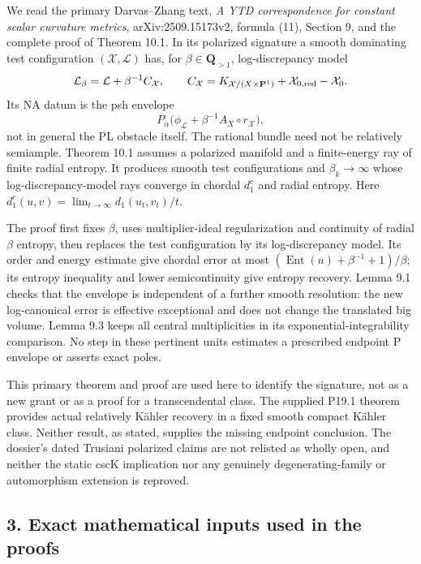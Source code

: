\documentclass[
  11pt,
]{article}
\begin{document}
We read the primary Darvas--Zhang text, \emph{A YTD correspondence for
constant scalar curvature metrics}, arXiv:2509.15173v2, formula (11),
Section 9, and the complete proof of Theorem 10.1. In its polarized
signature a smooth dominating test configuration
\((\mathcal X,\mathcal L)\) has, for \(\beta\in\mathbf Q_{>1}\),
log-discrepancy model \[
 \mathcal L_\beta=\mathcal L+\beta^{-1}C_{\mathcal X},\qquad
 C_{\mathcal X}=K_{\mathcal X/(X\times\mathbf P^1)}
                          +\mathcal X_{0,\rm red}-\mathcal X_0.
\] Its NA datum is the psh envelope \[
 P_\alpha\bigl(\phi_{\mathcal L}
                  +\beta^{-1}A_X\circ r_{\mathcal X}\bigr),
\] not in general the PL obstacle itself. The rational bundle need not
be relatively semiample. Theorem 10.1 assumes a polarized manifold and a
finite-energy ray of finite radial entropy. It produces smooth test
configurations and \(\beta_k\to\infty\) whose log-discrepancy-model rays
converge in chordal \(d_1^c\) and radial entropy. Here
\(d_1^c(u,v)=\lim_{t\to\infty}d_1(u_t,v_t)/t\).

The proof first fixes \(\beta\), uses multiplier-ideal regularization
and continuity of radial \(\beta\) entropy, then replaces the test
configuration by its log-discrepancy model. Its order and energy
estimate give chordal error at most
\((\operatorname{Ent}(u)+\beta^{-1}+1)/\beta\); its entropy inequality
and lower semicontinuity give entropy recovery. Lemma 9.1 checks that
the envelope is independent of a further smooth resolution: the new
log-canonical error is effective exceptional and does not change the
translated big volume. Lemma 9.3 keeps all central multiplicities in its
exponential-integrability comparison. No step in these pertinent units
estimates a prescribed endpoint P envelope or asserts exact poles.

This primary theorem and proof are used here to identify the signature,
not as a new grant or as a proof for a transcendental class. The
supplied P19.1 theorem provides actual relatively Kähler recovery in a
fixed smooth compact Kähler class. Neither result, as stated, supplies
the missing endpoint conclusion. The dossier's dated Trusiani polarized
claims are not relisted as wholly open, and neither the static cscK
implication nor any genuinely degenerating-family or automorphism
extension is reproved.

\subsection{3. Exact mathematical inputs used in the
proofs}\label{exact-mathematical-inputs-used-in-the-proofs}
\end{document}
